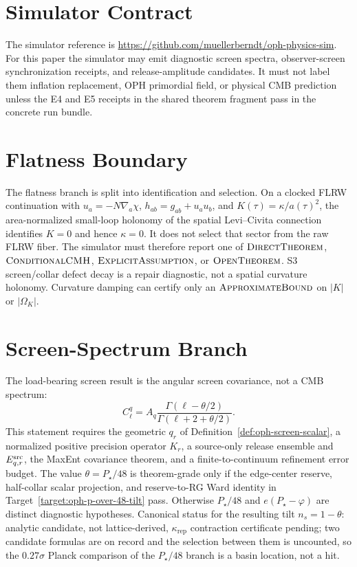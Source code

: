 \documentclass[11pt]{article}
\theoremstyle{remark}
\theoremstyle{plain}
\newcommand{\SimSourceRepo}{\url{https://github.com/muellerberndt/oph-physics-sim}}
\begin{document}
\section{Simulator Contract}

The simulator reference is \SimSourceRepo.  For this paper the simulator may emit diagnostic
screen spectra, observer-screen synchronization receipts, and release-amplitude candidates.  It
must not label them inflation replacement, OPH primordial field, or physical CMB prediction unless
the E4 and E5 receipts in the shared theorem fragment pass in the concrete run bundle.

\section{Flatness Boundary}

The flatness branch is split into identification and selection.  On a clocked FLRW continuation
with \(u_a=-N\nabla_a\chi\), \(h_{ab}=g_{ab}+u_au_b\), and
\(K(\tau)=\kappa/a(\tau)^2\), the area-normalized small-loop holonomy of the spatial
Levi--Civita connection identifies \(K=0\) and hence \(\kappa=0\).  It does not select that sector
from the raw FLRW fiber.  The simulator must therefore report one of
\(\textsc{DirectTheorem}\), \(\textsc{ConditionalCMH}\), \(\textsc{ExplicitAssumption}\), or
\(\textsc{OpenTheorem}\).  S3 screen/collar defect decay is a repair diagnostic, not a spatial
curvature holonomy.  Curvature damping can certify only an \(\textsc{ApproximateBound}\) on
\(|K|\) or \(|\Omega_K|\).

\section{Screen-Spectrum Branch}

The load-bearing screen result is the angular screen covariance, not a CMB spectrum:
\[
  C_\ell^q
  =
  A_q\frac{\Gamma(\ell-\theta/2)}{\Gamma(\ell+2+\theta/2)}.
\]
This statement requires the geometric \(q_r\) of Definition~\ref{def:oph-screen-scalar}, a
normalized positive precision operator \(K_r\), a source-only release ensemble and
\(E^{\rm src}_{q,r}\), the MaxEnt covariance theorem, and a finite-to-continuum refinement error
budget.  The value \(\theta=P_\star/48\) is theorem-grade only if the edge-center reserve,
half-collar scalar projection, and reserve-to-RG Ward identity in
Target~\ref{target:oph-p-over-48-tilt} pass.  Otherwise \(P_\star/48\) and
\(e(P_\star-\varphi)\) are distinct diagnostic hypotheses.  Canonical status
for the resulting tilt \(n_s=1-\theta\): analytic candidate, not
lattice-derived, \(\kappa_{\mathrm{rep}}\) contraction certificate pending;
two candidate formulas are on record and the selection between them is
uncounted, so the \(0.27\sigma\) Planck comparison of the \(P_\star/48\)
branch is a basin location, not a hit.
\end{document}
